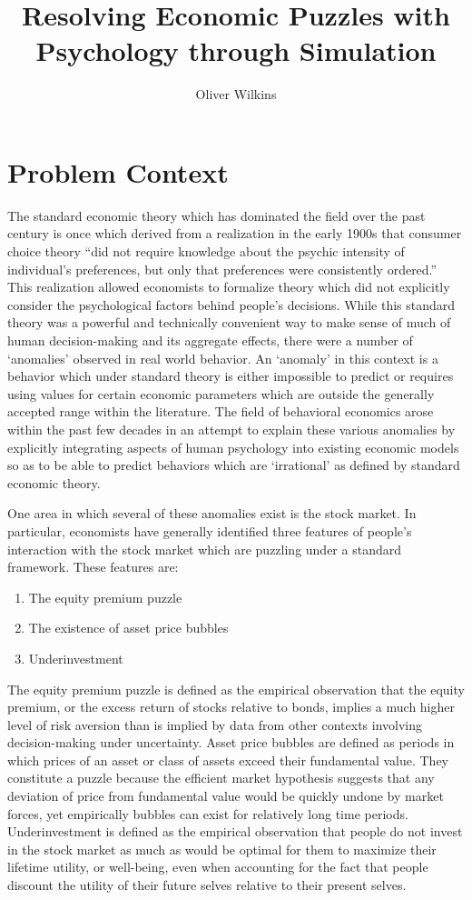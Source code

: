 \documentclass[10pt,twocolumn]{article}
\title{Resolving Economic Puzzles with Psychology through Simulation}
\author{Oliver Wilkins}
\affiliation{Occidental College}
\begin{document}
\maketitle

\section{Problem Context}
The standard economic theory which has dominated the field over the past century is once which derived from a realization in the early 1900s that consumer choice theory “did not require knowledge about the psychic intensity of individual’s preferences, but only that preferences were consistently ordered.”\cite{lehr} This realization allowed economists to formalize theory which did not explicitly consider the psychological factors behind people’s decisions. While this standard theory was a powerful and technically convenient way to make sense of much of human decision-making and its aggregate effects, there were a number of ‘anomalies’ observed in real world behavior. An ‘anomaly’ in this context is a behavior which under standard theory is either impossible to predict or requires using values for certain economic parameters which are outside the generally accepted range within the literature. The field of behavioral economics arose within the past few decades in an attempt to explain these various anomalies by explicitly integrating aspects of human psychology into existing economic models so as to be able to predict behaviors which are ‘irrational’ as defined by standard economic theory.

One area in which several of these anomalies exist is the stock market. In particular, economists have generally identified three features of people’s interaction with the stock market which are puzzling under a standard framework. These features are:
\begin{enumerate}
    \item The equity premium puzzle
    \item The existence of asset price bubbles 
    \item Underinvestment
\end{enumerate}
 The equity premium puzzle is defined as the empirical observation that the equity premium, or the excess return of stocks relative to bonds, implies a much higher level of risk aversion than is implied by data from other contexts involving decision-making under uncertainty. Asset price bubbles are defined as periods in which prices of an asset or class of assets exceed their fundamental value. They constitute a puzzle because the efficient market hypothesis suggests that any deviation of price from fundamental value would be quickly undone by market forces, yet empirically bubbles can exist for relatively long time periods. Underinvestment is defined as the empirical observation that people do not invest in the stock market as much as would be optimal for them to maximize their lifetime utility, or well-being, even when accounting for the fact that people discount the utility of their future selves relative to their present selves.
\end{document}
